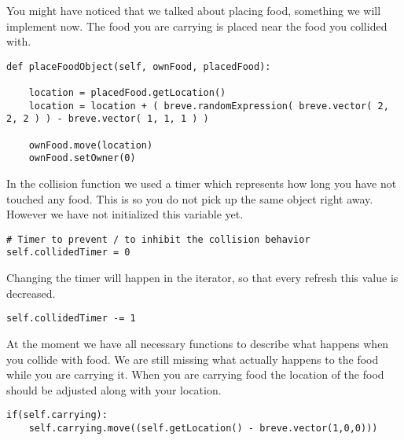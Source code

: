 You might have noticed that we talked about placing food, something we will implement now. The food you are carrying is placed near the food you collided with.

\begin{fullwidth}
\begin{lstlisting}
def placeFoodObject(self, ownFood, placedFood):

    location = placedFood.getLocation()
    location = location + ( breve.randomExpression( breve.vector( 2, 2, 2 ) ) - breve.vector( 1, 1, 1 ) )

    ownFood.move(location)
    ownFood.setOwner(0)
\end{lstlisting}
\end{fullwidth}

In the collision function we used a timer which represents how long you have not touched any food. This is so you do not pick up the same object right away. However we have not initialized this variable yet.
\begin{fullwidth}
\begin{lstlisting}
# Timer to prevent / to inhibit the collision behavior
self.collidedTimer = 0
\end{lstlisting}
\end{fullwidth}

Changing the timer will happen in the iterator, so that every refresh this value is decreased.

\begin{lstlisting}
self.collidedTimer -= 1
\end{lstlisting}

At the moment we have all necessary functions to describe what happens when you collide with food. We are still missing what actually happens to the food while you are carrying it. When you are carrying food the location of the food should be adjusted along with your location.
\begin{fullwidth}
\begin{lstlisting}
if(self.carrying):
    self.carrying.move((self.getLocation() - breve.vector(1,0,0)))
\end{lstlisting}
\end{fullwidth}

